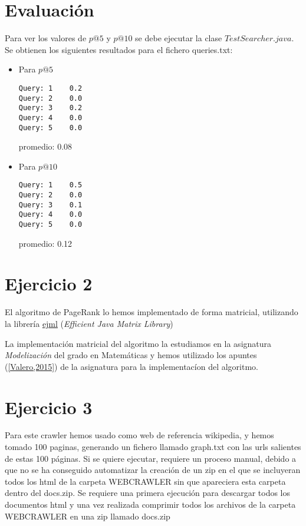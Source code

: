 \documentclass[palatino,nochap]{apuntes}
\begin{document}
\section{Evaluación}

Para ver los valores de $p@5$ y $p@10$ se debe ejecutar la clase $TestSearcher.java$. Se obtienen los siguientes resultados para el fichero queries.txt:

\begin{itemize}
	\item Para $p@5$
\begin{verbatim}
Query: 1	0.2
Query: 2	0.0
Query: 3	0.2
Query: 4	0.0
Query: 5	0.0
\end{verbatim}

promedio: 0.08
	\item Para $p@10$
\begin{verbatim}
Query: 1	0.5
Query: 2	0.0
Query: 3	0.1
Query: 4	0.0
Query: 5	0.0
\end{verbatim}

promedio: 0.12
\end{itemize}

\section{Ejercicio 2}

El algoritmo de PageRank lo hemos implementado de forma matricial, utilizando la librería \href{http://ejml.org/wiki/index.php?title=Main_Page}{ejml} (\textit{Efficient Java Matrix Library})

La implementación matricial del algoritmo la estudiamos en la asignatura \textit{Modelización} del grado en Matemáticas y hemos utilizado los apuntes (\href{https://www.dropbox.com/sh/kbymf37cykz77ha/AACL44kNShOUqhALNNnjdmcoa/modelizacion.pdf?dl=0}{[Valero,2015]}) de la asignatura para la implementacíon del algoritmo.

\section{Ejercicio 3}



Para este crawler hemos usado como web de referencia wikipedia, y hemos tomado 100 paginas, generando un fichero llamado graph.txt con las urls salientes de estas 100 páginas.
Si se quiere ejecutar, requiere un proceso manual, debido a que no se ha conseguido automatizar la creación de un zip en el que se incluyeran todos los html de la carpeta WEBCRAWLER sin que apareciera esta carpeta dentro del docs.zip.
Se requiere una primera ejecución para descargar todos los documentos html y una vez realizada comprimir todos los archivos de la carpeta WEBCRAWLER en una zip llamado docs.zip
\end{document}
